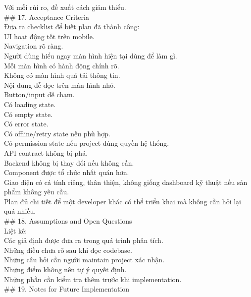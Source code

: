 \begin{enumerate}
Với mỗi rủi ro, đề xuất cách giảm thiểu. \\

\#\# 17. Acceptance Criteria \\

Đưa ra checklist để biết plan đã thành công: \\
\* UI hoạt động tốt trên mobile. \\
\* Navigation rõ ràng. \\
\* Người dùng hiểu ngay màn hình hiện tại dùng để làm gì. \\
\* Mỗi màn hình có hành động chính rõ. \\
\* Không có màn hình quá tải thông tin. \\
\* Nội dung dễ đọc trên màn hình nhỏ. \\
\* Button/input dễ chạm. \\
\* Có loading state. \\
\* Có empty state. \\
\* Có error state. \\
\* Có offline/retry state nếu phù hợp. \\
\* Có permission state nếu project dùng quyền hệ thống. \\
\* API contract không bị phá. \\
\* Backend không bị thay đổi nếu không cần. \\
\* Component được tổ chức nhất quán hơn. \\
\* Giao diện có cá tính riêng, thân thiện, không giống dashboard kỹ thuật nếu sản phẩm không yêu cầu. \\
\* Plan đủ chi tiết để một developer khác có thể triển khai mà không cần hỏi lại quá nhiều. \\


\#\# 18. Assumptions and Open Questions \\

Liệt kê: \\
\* Các giả định được đưa ra trong quá trình phân tích. \\
\* Những điều chưa rõ sau khi đọc codebase. \\
\* Những câu hỏi cần người maintain project xác nhận. \\
\* Những điểm không nên tự ý quyết định. \\
\* Những phần cần kiểm tra thêm trước khi implementation. \\


\#\# 19. Notes for Future Implementation \\


\end{enumerate}
